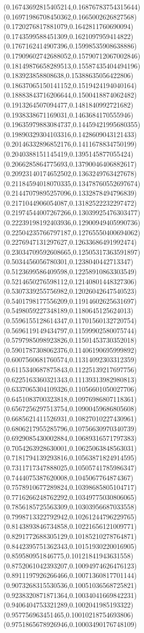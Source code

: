 {(0.16743692815405214,0.16876783754315644)
(0.16971986708450362,0.1665002626827568)
(0.1720276817881079,0.1642811760690094)
(0.1743599588451309,0.1621097959414822)
(0.1767162414907396,0.15998535908638886)
(0.17909602742688052,0.15790712067002846)
(0.18149876658289513,0.15587435404494196)
(0.183923858808638,0.15388635056422806)
(0.18637065150141152,0.1519424194040164)
(0.18883843716206644,0.1500418874062482)
(0.1913264507094477,0.1481840992721682)
(0.1938338671169031,0.1463684170555946)
(0.19635979883084737,0.14459421995680355)
(0.19890329304103316,0.1428609043121433)
(0.20146332896852176,0.1411678834750199)
(0.2040388151145419,0.1395145877055424)
(0.2066285864775693,0.13790046406882617)
(0.20923140174652502,0.1363249763427678)
(0.21184594018070335,0.13478760552697674)
(0.21447079895257096,0.1332878494796839)
(0.2171044906054087,0.13182522232297472)
(0.21974544007267266,0.13039925476303477)
(0.22239198192403936,0.12900949405990736)
(0.22504235766797187,0.12765550400694062)
(0.2276947131297627,0.12633686491992474)
(0.23034709592608665,0.12505317363591897)
(0.5034456056780301,0.1238040442713347)
(0.5123699586409598,0.12258910863303549)
(0.5214650276598112,0.12140801448327306)
(0.5307339255756982,0.12026042647540523)
(0.5401798177556209,0.11914602625631697)
(0.5498059227348189,0.1180645125624013)
(0.5596155128614347,0.11701560132720754)
(0.5696119149434797,0.11599902580075744)
(0.5797985098923826,0.11501453730352018)
(0.5901787308062376,0.11406190695999892)
(0.6007560681760574,0.11314092303312359)
(0.6115340687875843,0.11225139217697756)
(0.6225163360321343,0.11139313982980813)
(0.6337065304109326,0.11056601050027706)
(0.6451083700323818,0.10976986807118361)
(0.6567256297513754,0.10900459686805608)
(0.6685621411526931,0.10827010227430961)
(0.6806217955285796,0.10756630970340739)
(0.6929085430002884,0.10689316571797383)
(0.7054263928630001,0.10625063848563031)
(0.7181794139293816,0.10563871824914595)
(0.7311717347888025,0.10505741785986347)
(0.7444075387620008,0.1045067764874367)
(0.7578910677289824,0.10398685805104717)
(0.7716266248762292,0.10349775030806065)
(0.7856185725563309,0.10303956687033558)
(0.7998713322792942,0.10261244796229765)
(0.8143893846734858,0.10221656121009771)
(0.8291772688305129,0.10185210278764871)
(0.8442395751362343,0.10151930220016905)
(0.859580951846775,0.10121841943631558)
(0.8752061042393207,0.10094974626476123)
(0.8911197926266466,0.10071360817701144)
(0.9073268315530536,0.10051036568725821)
(0.9238320871871364,0.10034041669842231)
(0.9406404753321289,0.1002041985193322)
(0.957756963451465,0.10010218754693806)
(0.9751865678926946,0.10003490176748109)
}
